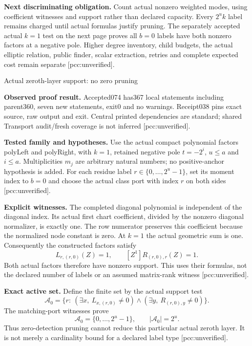 \documentclass[10pt]{article}
\begin{document}
\textbf{Next discriminating obligation.} Count actual nonzero weighted modes,
using coefficient witnesses and support rather than declared capacity. Every
$2^u k$ label remains charged until actual formulas justify pruning. The
separately accepted actual $k=1$ test on the next page proves all $b=0$ labels
have both nonzero factors at a negative pole. Higher degree inventory,
child budgets, the actual elliptic relation, public finder, scalar extraction,
retries and complete expected cost remain separate [pcc:unverified].
\newpage
\begin{center}{\Large Actual zeroth-layer support: no zero pruning}\end{center}
\textbf{Observed proof result.} Accepted074 has367 local statements including
parent360, seven new statements, exit0 and no warnings. Receipt038 pins exact
source, raw output and exit. Central printed dependencies are standard;
shared Transport audit/fresh coverage is not inferred [pcc:unverified].

\textbf{Tested family and hypotheses.} Use the actual compact polynomial
factors polyLeft and polyRight, with $k=1$, retained negative pole
$t=-2^i$, $u\le a$ and $i\le a$. Multiplicities $m_j$ are arbitrary natural
numbers; no positive-anchor hypothesis is added. For each residue label
$r\in\{0,\ldots,2^u-1\}$, set its moment index to $b=0$ and choose the actual
class port with index $r$ on both sides [pcc:unverified].

\textbf{Explicit witnesses.} The completed diagonal polynomial is independent
of the diagonal index. Its actual first chart coefficient, divided by the
nonzero diagonal normalizer, is exactly one. The row numerator preserves this
coefficient because the normalized node constant is zero. At $k=1$ the actual
geometric sum is one. Consequently the constructed factors satisfy
\[
 L_{r,(r,0)}(Z)=1,\qquad [Z^1]R_{(r,0),r}(Z)=1.
\]
Both actual factors therefore have nonzero support. This uses their formulas,
not the declared number of labels or an assumed matrix-rank witness
[pcc:unverified].

\textbf{Exact active set.} Define the finite set by the actual support test
\[
 \mathcal A_0=\{r:\ (\exists x,\ L_{x,(r,0)}\ne0)
                  \land(\exists y,\ R_{(r,0),y}\ne0)\}.
\]
The matching-port witnesses prove
\[
 \mathcal A_0=\{0,\ldots,2^u-1\},\qquad |\mathcal A_0|=2^u.
\]
Thus zero-detection pruning cannot reduce this particular actual zeroth layer.
It is not merely a cardinality bound for a declared label type
[pcc:unverified].
\end{document}
